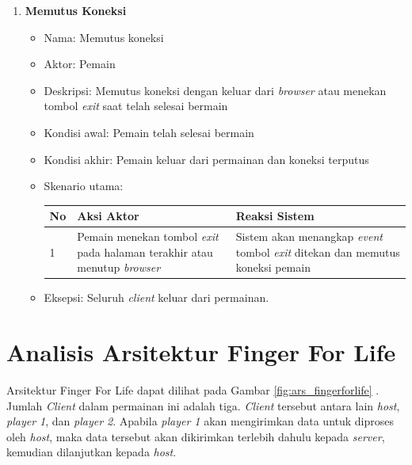 \begin{enumerate}
\begin{itemize}
		\end{itemize}
	
	\item \textbf{Memutus Koneksi}
	
		\begin{itemize}
			\item Nama: Memutus koneksi
			
			\item Aktor: Pemain
			
			\item Deskripsi: Memutus koneksi dengan keluar dari \textit{browser} atau menekan tombol \textit{exit} saat telah selesai bermain
			
			\item Kondisi awal: Pemain telah selesai bermain
			
			\item Kondisi akhir: Pemain keluar dari permainan dan koneksi terputus
			
			\item Skenario utama:
			
\begin{tabular}{ |p{1cm}|p{4cm}|p{4cm}|}
	\hline
	No & Aksi Aktor & Reaksi Sistem \\ \hline
	1 & Pemain menekan tombol \textit{exit} pada halaman terakhir atau menutup \textit{browser} & Sistem akan menangkap \textit{event} tombol \textit{exit} ditekan dan memutus koneksi pemain \\ \hline
\end{tabular}
			
			\item Eksepsi: Seluruh \textit{client} keluar dari permainan.
		\end{itemize}
\end{enumerate}


\section{Analisis Arsitektur Finger For Life}
Arsitektur Finger For Life dapat dilihat pada Gambar \ref{fig:ars_fingerforlife} . Jumlah \textit{Client} dalam permainan ini adalah tiga. \textit{Client} tersebut antara lain \textit{host}, \textit{player 1}, dan \textit{player 2}. Apabila \textit{player 1} akan mengirimkan data untuk diproses oleh \textit{host}, maka data tersebut akan dikirimkan terlebih dahulu kepada \textit{server}, kemudian dilanjutkan kepada \textit{host}.

